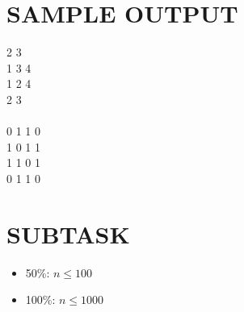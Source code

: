 \documentclass[a4paper,12pt]{article}
\begin{document}
\section*{SAMPLE OUTPUT}
\begin{tcolorbox}
2 3 \\
1 3 4 \\
1 2 4 \\
2 3 \\
\\
0 1 1 0 \\
1 0 1 1 \\
1 1 0 1 \\
0 1 1 0 \\
\end{tcolorbox}

\section*{SUBTASK}
\begin{itemize}
    \item 50\%: $n \le 100$
    \item 100\%: $n \le 1000$
\end{itemize}
\end{document}
